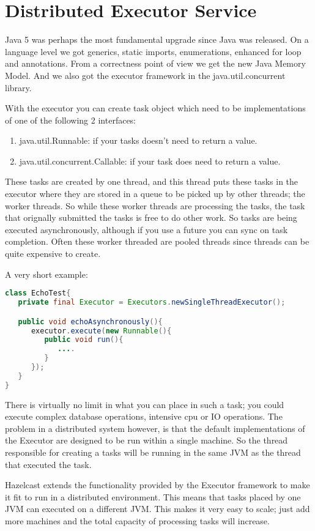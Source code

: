 \chapter{Distributed Executor Service}

Java 5 was perhaps the most fundamental upgrade since Java was released. On a language level we got generics, static imports, enumerations, enhanced for loop and annotations. From a correctness point of view we get the new Java Memory Model. And we also got the executor framework in the java.util.concurrent library.

With the executor you can create task object which need to be implementations of one of the following
2 interfaces:
\begin{enumerate}
\item java.util.Runnable: if your tasks doesn't need to return a value.
\item java.util.concurrent.Callable: if your task does need to return a value.
\end{enumerate}
These tasks are created by one thread, and this thread puts these tasks in the executor where they are
stored in a queue to be picked up by other threads; the worker threads. So while these worker threads are processing the tasks, the task that orignally submitted the tasks is free to do other work. So tasks are being executed asynchronously, although if you use a future you can sync on task completion. Often these worker threaded are pooled threads since threads can be quite expensive to create. 

A very short example:
\begin{lstlisting}[language=java]
class EchoTest{
   private final Executor = Executors.newSingleThreadExecutor();

   public void echoAsynchronously(){
      executor.execute(new Runnable(){
         public void run(){
            ....
         }
      });	
   }
}
\end{lstlisting}

There is virtually no limit in what you can place in such a task; you could execute complex database operations, intensive cpu or IO operations. The problem in a distributed system however, is that the default implementations of the Executor are designed to be run within a single machine. So the thread responsible for creating a tasks will be running in the same JVM as the thread that executed the task.

Hazelcast extends the functionality provided by the Executor framework to make it fit to run in a distributed environment. This means that tasks placed by one JVM can executed on a different JVM. This makes it very easy to scale; just add more machines and the total capacity of processing tasks will increase.

